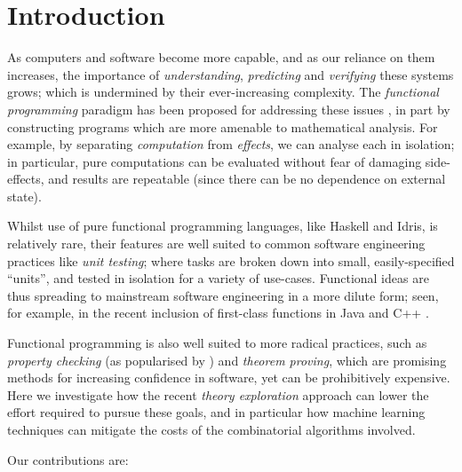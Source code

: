 \section{Introduction}

\iffalse
TODO
Intro + motivation

About 2 pages

Haskell is a mainstream FP language (motivation)

QuickCheck (example)

How to come up with the properties

Mention theory exploration
\fi

As computers and software become more capable, and as our reliance on them increases, the importance of \emph{understanding}, \emph{predicting} and \emph{verifying} these systems grows; which is undermined by their ever-increasing complexity. The \emph{functional programming} paradigm has been proposed for addressing these issues \cite{hughes1989functional}, in part by constructing programs which are more amenable to mathematical analysis. For example, by separating \emph{computation} from \emph{effects}, we can analyse each in isolation; in particular, pure computations can be evaluated without fear of damaging side-effects, and results are repeatable (since there can be no dependence on external state).

Whilst use of pure functional programming languages, like Haskell and Idris, is relatively rare, their features are well suited to common software engineering practices like \emph{unit testing}; where tasks are broken down into small, easily-specified ``units'', and tested in isolation for a variety of use-cases. Functional ideas are thus spreading to mainstream software engineering in a more dilute form; seen, for example, in the recent inclusion of first-class functions in Java \cite{gosling2015java} and C++ \cite{willcock2006lambda}.

Functional programming is also well suited to more radical practices, such as \emph{property checking} (as popularised by \qcheck{}) and \emph{theorem proving}, which are promising methods for increasing confidence in software, yet can be prohibitively expensive. Here we investigate how the recent \emph{theory exploration} approach can lower the effort required to pursue these goals, and in particular how machine learning techniques can mitigate the costs of the combinatorial algorithms involved.

Our contributions are:


